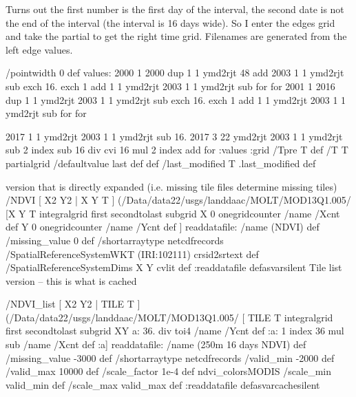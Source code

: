 Turns out the first number is the first day of the interval, the second date is
not the end of the interval (the interval is 16 days wide).
So I enter the edges grid and take the partial to get the right time grid.
Filenames are generated from the left edge values.
\begin{ingrid}
/pointwidth 0 def
values:
2000
1
2000
{
dup  1 1 ymd2rjt 48 add 2003 1 1 ymd2rjt sub
exch
16. exch
1 add 1 1 ymd2rjt 2003 1 1 ymd2rjt sub
{} for
} for
2001
1
2016
{
dup  1 1 ymd2rjt 2003 1 1 ymd2rjt sub
exch
16. exch
1 add 1 1 ymd2rjt 2003 1 1 ymd2rjt sub
{} for
} for

2017
1 1 ymd2rjt 2003 1 1 ymd2rjt sub
16.
2017 3 22 ymd2rjt 2003 1 1 ymd2rjt sub
2 index
     sub
    16 div
    cvi
    16 mul
2 index add
{} for
:values
:grid
/Tpre T def
/T T
partialgrid
/defaultvalue {last} def
def
/last_modified T .last_modified def
\end{ingrid}
version that is directly expanded (i.e. missing tile files determine missing tiles)
/NDVI
{
[ X2 Y2 | X Y T ]
(/Data/data22/usgs/landdaac/MOLT/MOD13Q1.005/%
 [X Y T integralgrid first secondtolast subgrid X 0 onegridcounter /name /Xcnt def Y 0 onegridcounter  /name /Ycnt def ]
readdatafile:
/name (NDVI) def
/missing_value 0 def
/shortarraytype netcdfrecords
/SpatialReferenceSystemWKT (IRI:102111) crsid2srtext def
/SpatialReferenceSystemDims { X Y } cvlit  def
:readdatafile
} defasvarsilent
Tile list version -- this is what is cached
\begin{ingrid}
/NDVI_list
{
[ X2 Y2 | TILE T ]
(/Data/data22/usgs/landdaac/MOLT/MOD13Q1.005/%
 [ TILE T integralgrid first secondtolast subgrid
XY
  a:
    36. div
    toi4
    /name /Ycnt def
    :a: 1 index
      36 mul
      sub
     /name /Xcnt def
     :a]
readdatafile:
/name (250m 16 days NDVI) def
/missing_value -3000 def
/shortarraytype netcdfrecords
/valid_min -2000 def
/valid_max 10000 def
/scale_factor 1e-4 def
ndvi_colorsMODIS
/scale_min valid_min def
/scale_max valid_max def
:readdatafile
} defasvarcachesilent
\end{ingrid}
